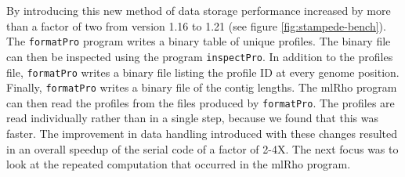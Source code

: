 \documentclass{sig-alternate}
\newcommand{\ty}{\texttt}
\begin{document}
By introducing this new method of data storage performance increased by more than a factor of two from version
1.16 to 1.21 (see figure \ref{fig:stampede-bench}). The \ty{formatPro} program writes a binary table of unique
profiles.
The binary file can then be inspected using the program \ty{inspectPro}.
In addition to the profiles file, \ty{formatPro} writes a binary file
listing the profile ID at every genome position.
Finally, \ty{formatPro} writes a binary file of the contig lengths.
The mlRho program can then read the profiles from the files produced by \ty{formatPro}.
The profiles are read individually rather than in a single
step, because we found that this was
faster. The improvement in data handling introduced with these changes resulted in an overall speedup of the
serial code of a factor of 2-4X. The next focus was to look at the repeated computation that occurred in the
mlRho program. 
\end{document}
